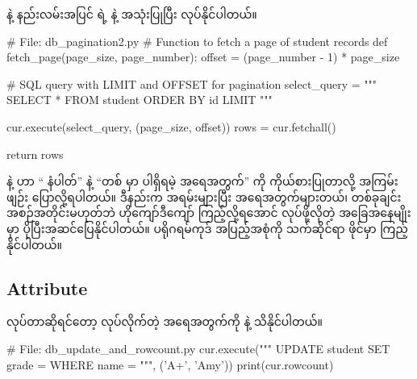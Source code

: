  နဲ့ နည်းလမ်းအပြင်  ရဲ့  နဲ့  အသုံးပြုပြီး  လုပ်နိုင်ပါတယ်။ 
%
\begin{py}
# File: db_pagination2.py
# Function to fetch a page of student records
def fetch_page(page_size, page_number):
    offset = (page_number - 1) * page_size

    # SQL query with LIMIT and OFFSET for pagination
    select_query = """
        SELECT * FROM student
        ORDER BY id
        LIMIT %
    """

    cur.execute(select_query, (page_size, offset))
    rows = cur.fetchall()

    return rows
\end{py}
% 
 နဲ့  ဟာ “ နံပါတ်” နဲ့ “တစ်  မှာ ပါရှိရမဲ့  အရေအတွက်” ကို ကိုယ်စားပြုတာလို့ အကြမ်းဖျဉ်း ပြောလို့ရပါတယ်။ ဒီနည်းက  အရမ်းများပြီး  အရေအတွက်များတယ်၊  တစ်ခုချင်း အစဉ်အတိုင်းမဟုတ်ဘဲ ဟိုကျော်ဒီကျော် ကြည့်လို့ရအောင် လုပ်ဖို့လိုတဲ့ အခြေအနေမျိုးမှာ ပိုပြီးအဆင်ပြေနိုင်ပါတယ်။ ပရိုဂရမ်ကုဒ် အပြည့်အစုံကို သက်ဆိုင်ရာ ဖိုင်မှာ ကြည့်နိုင်ပါတယ်။

\subsection*{ Attribute}
 လုပ်တာဆိုရင်တော့  လုပ်လိုက်တဲ့  အရေအတွက်ကို   နဲ့ သိနိုင်ပါတယ်။
%
\begin{py}
# File: db_update_and_rowcount.py
cur.execute("""
    UPDATE student
    SET grade = %
    WHERE name = %
""", ('A+', 'Amy'))
print(cur.rowcount)
\end{py}
%

